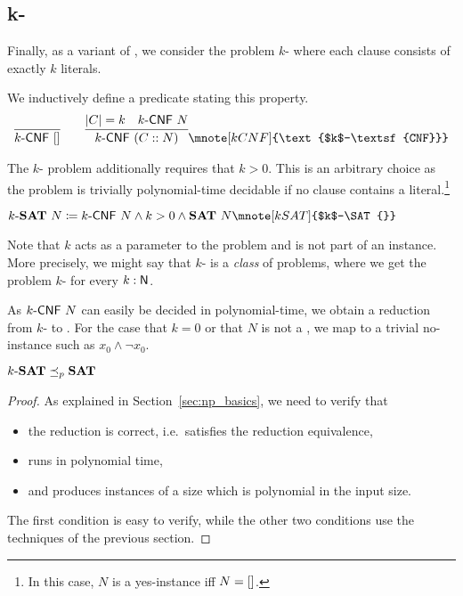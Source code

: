 \newcommand{\kCNF}[1]{\text{$#1$-\textsf{CNF}}}
\subsection{k-\SAT{}}
Finally, as a variant of \SAT{}, we consider the problem $k$-\SAT{} where each clause consists of exactly $k$ literals. 

We inductively define a predicate stating this property.
\begin{align*}
  \infer{\kCNF{k}~\nil}{} \qquad \infer{\kCNF{k}~(C :: N)}{\length{C} = k \quad \kCNF{k}~N}\mnote[kCNF]{\kCNF{k}}
\end{align*}

The $k$-\SAT{} problem additionally requires that $k > 0$. This is an arbitrary choice as the problem is trivially polynomial-time decidable if no clause contains a literal.\footnote{In this case, $N$ is a yes-instance iff $N = []$.}
\begin{definition}[$k$-\SAT{}][kSAT]
  $\text{$k$-\SAT{}}~N \defeq \kCNF{k}~N \land k > 0 \land \SAT{}~N \mnote[kSAT]{$k$-\SAT{}}$
\end{definition}

\begin{remark}
Note that $k$ acts as a parameter to the problem and is not part of an instance. More precisely, we might say that $k$-\SAT{} is a \emph{class} of problems, where we get the problem $k$-\SAT{} for every $k : \mathsf{N}$. 
\end{remark}

As $\kCNF{k}~N$ can easily be decided in polynomial-time, we obtain a reduction from $k$-\SAT{} to \SAT{}. For the case that $k = 0$ or that $N$ is not a \kCNF{k}, we map to a trivial no-instance such as $x_0 \land \lnot x_0$. 
\begin{lemma}
  $\text{$k$-\textbf{SAT}{}} \preceq_p{} \textbf{SAT}{}$
\end{lemma}
\begin{proof}
  As explained in Section~\ref{sec:np_basics}, we need to verify that 
  \begin{itemize}
    \item the reduction is correct, i.e.\ satisfies the reduction equivalence, 
    \item runs in polynomial time, 
    \item and produces instances of a size which is polynomial in the input size.
  \end{itemize}
  The first condition is easy to verify, while the other two conditions use the techniques of the previous section.
\end{proof}

